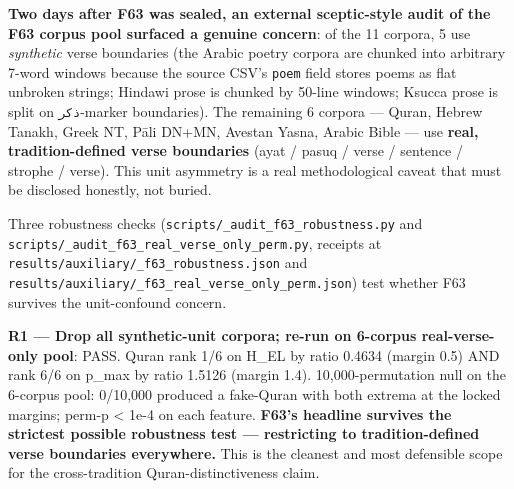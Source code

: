 \documentclass[
]{article}
\begin{document}
\textbf{Two days after F63 was sealed, an external sceptic-style audit
of the F63 corpus pool surfaced a genuine concern}: of the 11 corpora, 5
use \emph{synthetic} verse boundaries (the Arabic poetry corpora are
chunked into arbitrary 7-word windows because the source CSV's
\texttt{poem} field stores poems as flat unbroken strings; Hindawi prose
is chunked by 50-line windows; Ksucca prose is split on
\texttt{ذكر}-marker boundaries). The remaining 6 corpora --- Quran,
Hebrew Tanakh, Greek NT, Pāli DN+MN, Avestan Yasna, Arabic Bible --- use
\textbf{real, tradition-defined verse boundaries} (ayat / pasuq / verse
/ sentence / strophe / verse). This unit asymmetry is a real
methodological caveat that must be disclosed honestly, not buried.

Three robustness checks (\texttt{scripts/\_audit\_f63\_robustness.py}
and \texttt{scripts/\_audit\_f63\_real\_verse\_only\_perm.py}, receipts
at \texttt{results/auxiliary/\_f63\_robustness.json} and
\texttt{results/auxiliary/\_f63\_real\_verse\_only\_perm.json}) test
whether F63 survives the unit-confound concern.

\textbf{R1 --- Drop all synthetic-unit corpora; re-run on 6-corpus
real-verse-only pool}: PASS. Quran rank 1/6 on H\_EL by ratio 0.4634
(margin 0.5) AND rank 6/6 on p\_max by ratio 1.5126 (margin 1.4).
10,000-permutation null on the 6-corpus pool: 0/10,000 produced a
fake-Quran with both extrema at the locked margins; perm-p \textless{}
1e-4 on each feature. \textbf{F63's headline survives the strictest
possible robustness test --- restricting to tradition-defined verse
boundaries everywhere.} This is the cleanest and most defensible scope
for the cross-tradition Quran-distinctiveness claim.
\end{document}
